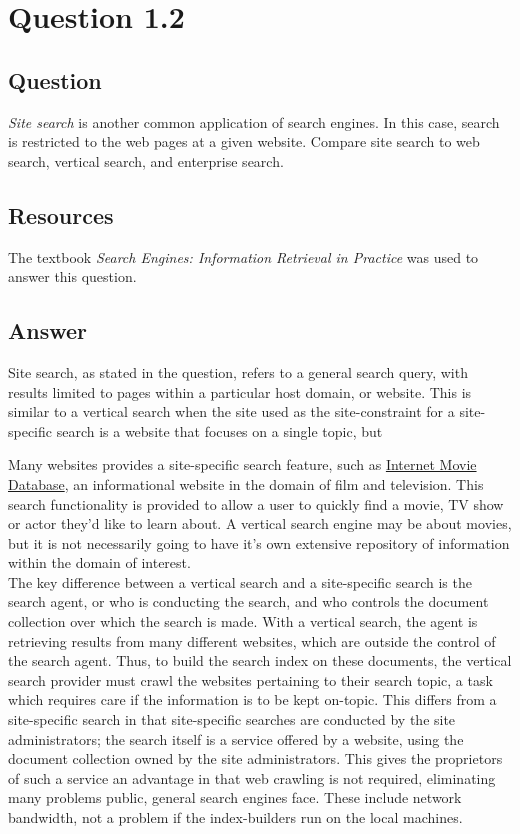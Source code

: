 \section{Question 1.2}


\subsection{Question}
\textit{Site search} is another common application of search engines. In this case, search is restricted to the web pages at a given website. Compare site search to web search, vertical search, and enterprise search.


\subsection{Resources}
The textbook \textit{Search Engines: Information Retrieval in Practice} \cite{seirip} was used to answer this question.


\subsection{Answer}
Site search, as stated in the question, refers to a general search query, with results limited to pages within a particular host domain, or website.  This is similar to a vertical search when the site used as the site-constraint for a site-specific search is a website that focuses on a single topic, but 

Many websites provides a site-specific search feature, such as \hyperref[http://www.imdb.com]{Internet Movie Database}, an informational website in the domain of film and television.  This search functionality is provided to allow a user to quickly find a movie, TV show or actor they'd like to learn about.  A vertical search engine may be about movies, but it is not necessarily going to have it's own extensive repository of information within the domain of interest.\\

The key difference between a vertical search and a site-specific search is the search agent, or who is conducting the search, and who controls the document collection over which the search is made.  With a vertical search, the agent is retrieving results from many different websites, which are outside the control of the search agent.  Thus, to build the search index on these documents, the vertical search provider must crawl the websites pertaining to their search topic, a task which requires care if the information is to be kept on-topic.  This differs from a site-specific search in that site-specific searches are conducted by the site administrators; the search itself is a service offered by a website, using the document collection owned by the site administrators.  This gives the proprietors of such a service an advantage in that web crawling is not required, eliminating many problems public, general search engines face.  These include network bandwidth, not a problem if the index-builders run on the local machines.  

